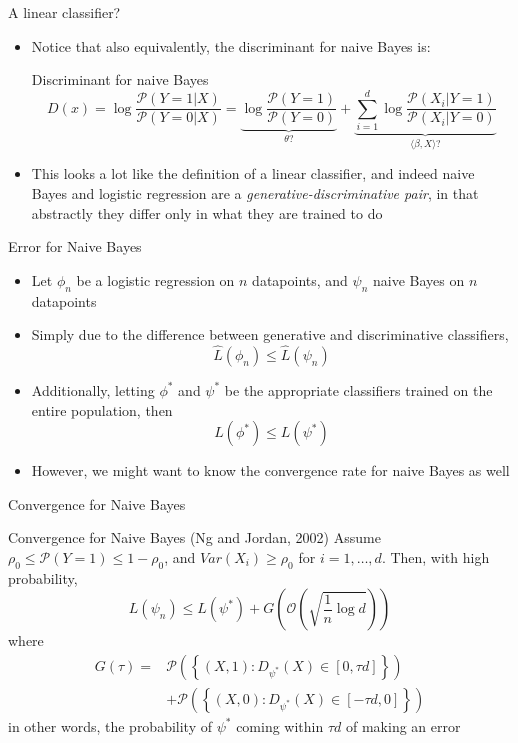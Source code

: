 \documentclass{beamer}
\renewcommand{\Pr}[1]{\mathcal{P} \left( #1 \right)}
\newcommand{\pa}[1]{\left( #1 \right)}
\newcommand{\br}[1]{\left\{ #1 \right\} }
\newcommand{\an}[1]{\langle #1 \rangle}
\begin{document}
\begin{frame}{A linear classifier?}
\begin{itemize}
\item Notice that also equivalently, the discriminant for naive Bayes is:
\begin{block}{Discriminant for naive Bayes}
\[ D(x) = \log \frac{\Pr{Y=1|X}}{\Pr{Y=0|X}} = \underbrace{\log\frac{\Pr{Y=1}}{\Pr{Y=0}}}_{\theta?} +  \underbrace{\sum_{i=1}^d \log \frac{\Pr{X_i|Y=1}}{\Pr{X_i|Y=0}}}_{\an{\beta,X}?} \]
\end{block}
\item This looks a lot like the definition of a linear classifier, and indeed naive Bayes and logistic regression are a \emph{generative-discriminative pair}, in that abstractly they differ only in what they are trained to do
\end{itemize}
\end{frame}

\begin{frame}{Error for Naive Bayes}
\begin{itemize}
\item Let $\phi_n$ be a logistic regression on $n$ datapoints, and $\psi_n$ naive Bayes on $n$ datapoints
\item Simply due to the difference between generative and discriminative classifiers,
\[ \hat{L}(\phi_n) \leq \hat{L}(\psi_n) \]
\item Additionally, letting $\phi^*$ and $\psi^*$ be the appropriate classifiers trained on the entire population, then
\[ L(\phi^*) \leq L(\psi^*) \]
\item However, we might want to know the convergence rate for naive Bayes as well
\end{itemize}
\end{frame}

\begin{frame}{Convergence for Naive Bayes}
\begin{block}{Convergence for Naive Bayes (Ng and Jordan, 2002)}
Assume  $\rho_0 \leq \Pr{Y=1} \leq 1 - \rho_0$, and $Var(X_i) \geq \rho_0$ for $i=1,\ldots,d$. Then, with high probability,
\[ L(\psi_n) \leq L(\psi^*) + G\pa{\mathcal O\pa{\sqrt{\frac1n \log d}}} \]
where
\begin{align*}
 G(\tau)   = &  \Pr{\br{(X,1) : D_{\psi^*}(X) \in [0,\tau d]}} \\
 	&   + \Pr{ \br{(X,0) : D_{\psi^*}(X) \in [-\tau d,0]}} \end{align*}
in other words, the probability of $\psi^*$ coming within $\tau d$ of making an error
\end{block}
\end{frame}
\end{document}
